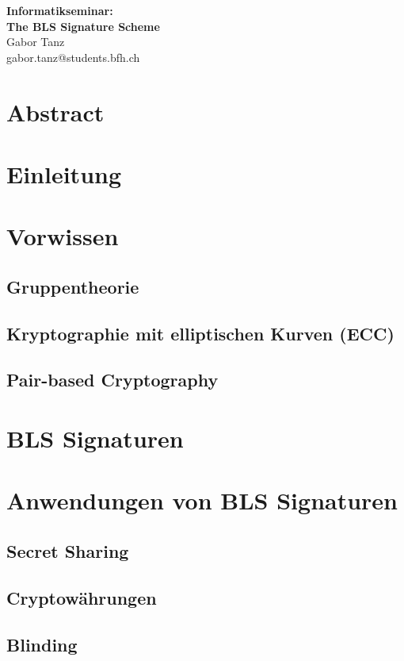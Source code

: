 \documentclass[a4paper,12pt]{scrartcl}
\begin{document}
\begin{titlepage}
\begin{center}
\vspace*{3cm}
\vspace{1cm}
\Huge \textbf{Informatikseminar: \\ The BLS Signature Scheme} \\
\vspace{6cm}
\vspace{1cm}
\large Gabor Tanz \\ gabor.tanz@students.bfh.ch \\
\end{center}
\end{titlepage}

\tableofcontents

\pagebreak

\section{Abstract}
\pagebreak

\section{Einleitung}
\pagebreak

\section{Vorwissen}
\subsection{Gruppentheorie}
\subsection{Kryptographie mit elliptischen Kurven (ECC)}
\subsection{Pair-based Cryptography}
\pagebreak

\section{BLS Signaturen}
\pagebreak

\section{Anwendungen von BLS Signaturen}
\subsection{Secret Sharing}
\subsection{Cryptowährungen}
\subsection{Blinding}
\pagebreak
\end{document}

